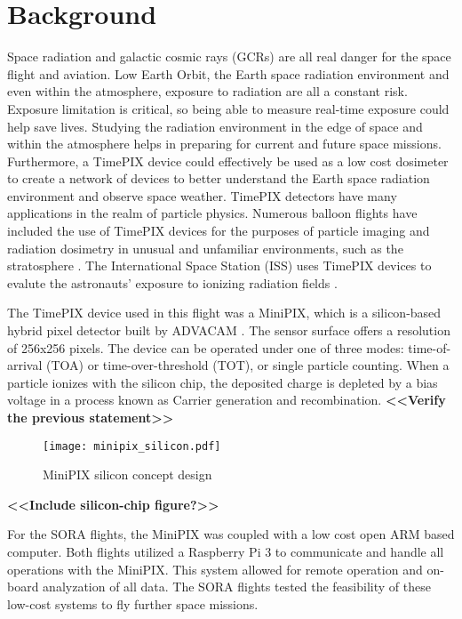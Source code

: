 %
%

\section{Background}
\label{Background}
Space radiation and galactic cosmic rays (GCRs) are all real danger for the space flight and aviation.  Low Earth Orbit, the Earth space radiation environment and even within the atmosphere, exposure to radiation are all a constant risk. Exposure limitation is critical, so being able to measure real-time exposure could help save lives.  Studying the radiation environment in the edge of space and within the atmosphere helps in preparing for current and future space missions.  Furthermore, a TimePIX device could effectively be used as a low cost dosimeter to create a network of devices to better understand the Earth space radiation environment and observe space weather.
TimePIX detectors have many applications in the realm of particle physics. 
%
Numerous balloon flights have included the use of TimePIX devices for the purposes of particle imaging and radiation dosimetry in unusual and unfamiliar environments, such as the stratosphere \cite{bexus}. 
%
The International Space Station (ISS) uses TimePIX devices to evalute the astronauts' exposure to ionizing radiation fields \cite{timepix}.

The TimePIX device used in this flight was a MiniPIX, which is a silicon-based hybrid pixel detector built by ADVACAM \cite{advacam}. 
%
The sensor surface offers a resolution of 256x256 pixels.
%
The device can be operated under one of three modes: time-of-arrival (TOA) or time-over-threshold (TOT), or single particle counting. 
%
When a particle ionizes with the silicon chip, the deposited charge is depleted by a bias voltage in a process known as Carrier generation and recombination. \textbf{<<Verify the previous statement>>}

\begin{figure}[h]
    \centering
    \texttt{[image: minipix\_silicon.pdf]}
    \caption{MiniPIX silicon concept design}
    \label{fig:minipix_silicon}
\end{figure}
%
\textbf{<<Include silicon-chip figure?>>}
%

For the SORA flights, the MiniPIX was coupled with a low cost open ARM based computer.  Both flights utilized a Raspberry Pi 3 to communicate and handle all operations with the MiniPIX.  This system allowed for remote operation and on-board analyzation of all data.  The SORA flights tested the feasibility of these low-cost systems to fly further space missions.  